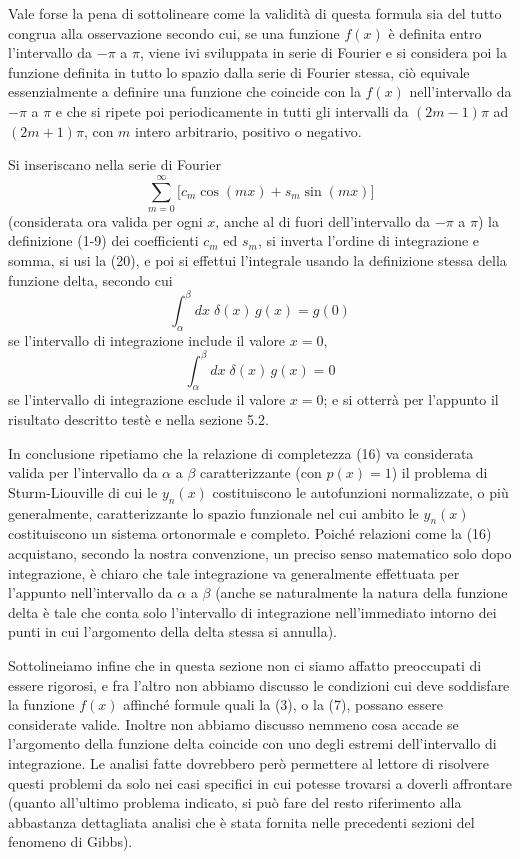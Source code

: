 \documentclass[11pt, a4paper]{book}
\numberwithin{equation}{section}
\begin{document}
Vale forse la pena di sottolineare come la validità di questa formula sia del tutto congrua alla osservazione secondo cui, se una funzione $f(x)$ è definita entro l'intervallo da $-\pi$ a $\pi$, viene ivi sviluppata in serie di Fourier e si considera poi la funzione definita in tutto lo spazio dalla serie di Fourier stessa, ciò equivale essenzialmente a definire una funzione che coincide con la $f(x)$ nell'intervallo da $-\pi$ a $\pi$ e che si ripete poi periodicamente in tutti gli intervalli da $(2m-1)\pi$ ad $(2m+1)\pi$, con $m$ intero arbitrario, positivo o negativo.

Si inseriscano nella serie di Fourier
\[
  \sum_{m=0}^{\infty}\bigl[c_m\cos(mx)+s_m\sin(mx)\bigr]
\]
(considerata ora valida per ogni $x$, anche al di fuori dell'intervallo da $-\pi$ a $\pi$) la definizione (1-9) dei coefficienti $c_m$ ed $s_m$, si inverta l'ordine di integrazione e somma, si usi la (20), e poi si effettui l'integrale usando la definizione stessa della funzione delta, secondo cui
\[
  \int_\alpha^\beta dx\;\delta(x)\,g(x) = g(0)
\]
se l'intervallo di integrazione include il valore $x=0$,
\[
  \int_\alpha^\beta dx\;\delta(x)\,g(x) = 0
\]
se l'intervallo di integrazione esclude il valore $x=0$; e si otterrà per l'appunto il risultato descritto testè e nella sezione 5.2.

In conclusione ripetiamo che la relazione di completezza (16) va considerata valida per l'intervallo da $\alpha$ a $\beta$ caratterizzante (con $p(x)=1$) il problema di Sturm-Liouville di cui le $y_n(x)$ costituiscono le autofunzioni normalizzate, o più generalmente, caratterizzante lo spazio funzionale nel cui ambito le $y_n(x)$ costituiscono un sistema ortonormale e completo. Poiché relazioni come la (16) acquistano, secondo la nostra convenzione, un preciso senso matematico solo dopo integrazione, è chiaro che tale integrazione va generalmente effettuata per l'appunto nell'intervallo da $\alpha$ a $\beta$ (anche se naturalmente la natura della funzione delta è tale che conta solo l'intervallo di integrazione nell'immediato intorno dei punti in cui l'argomento della delta stessa si annulla).

Sottolineiamo infine che in questa sezione non ci siamo affatto preoccupati di essere rigorosi, e fra l'altro non abbiamo discusso le condizioni cui deve soddisfare la funzione $f(x)$ affinché formule quali la (3), o la (7), possano essere considerate valide. Inoltre non abbiamo discusso nemmeno cosa accade se l'argomento della funzione delta coincide con uno degli estremi dell'intervallo di integrazione. Le analisi fatte dovrebbero però permettere al lettore di risolvere questi problemi da solo nei casi specifici in cui potesse trovarsi a doverli affrontare (quanto all'ultimo problema indicato, si può fare del resto riferimento alla abbastanza dettagliata analisi che è stata fornita nelle precedenti sezioni del fenomeno di Gibbs).
\end{document}
